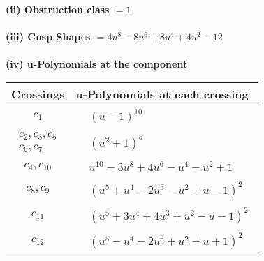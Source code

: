 \documentclass[1p]{elsarticle_modified}
\theoremstyle{definition}
\begin{document}
\flushleft \textbf{(ii) Obstruction class $= 1$}\\~\\
\flushleft \textbf{(iii) Cusp Shapes $= 4 u^8-8 u^6+8 u^4+4 u^2-12$}\\~\\
\newpage\renewcommand{\arraystretch}{1}
\flushleft \textbf{(iv) u-Polynomials at the component}\newline \\
\begin{tabular}{m{50pt}|m{274pt}}
Crossings & \hspace{64pt}u-Polynomials at each crossing \\
\hline $$\begin{aligned}c_{1}\end{aligned}$$&$\begin{aligned}
&(u-1)^{10}
\end{aligned}$\\
\hline $$\begin{aligned}c_{2},c_{3},c_{5}\\c_{6},c_{7}\end{aligned}$$&$\begin{aligned}
&(u^2+1)^5
\end{aligned}$\\
\hline $$\begin{aligned}c_{4},c_{10}\end{aligned}$$&$\begin{aligned}
&u^{10}-3 u^8+4 u^6- u^4- u^2+1
\end{aligned}$\\
\hline $$\begin{aligned}c_{8},c_{9}\end{aligned}$$&$\begin{aligned}
&(u^5+u^4-2 u^3- u^2+u-1)^2
\end{aligned}$\\
\hline $$\begin{aligned}c_{11}\end{aligned}$$&$\begin{aligned}
&(u^5+3 u^4+4 u^3+u^2- u-1)^2
\end{aligned}$\\
\hline $$\begin{aligned}c_{12}\end{aligned}$$&$\begin{aligned}
&(u^5- u^4-2 u^3+u^2+u+1)^2
\end{aligned}$\\
\hline
\end{tabular}\\~\\
\end{document}
